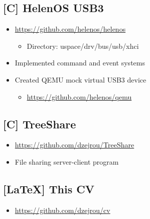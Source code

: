 \documentclass[8pt]{article}
\newcommand\csharp{C\scalerel*{\#}{X}}
\begin{document}
\begin{minipage}[t]{0.45\textwidth}
    \centering

    \subsection*{[C] HelenOS USB3}
    \begin{itemize}
        \item \url{https://github.com/helenos/helenos}
        \begin{itemize}
            \item Directory: uspace/drv/bus/usb/xhci
        \end{itemize}
        \item Implemented command and event systems
        \item Created QEMU mock virtual USB3 device
        \begin{itemize}
            \item \url{https://github.com/helenos/qemu}
        \end{itemize}
    \end{itemize}

    \subsection*{[\csharp] TreeShare}
    \begin{itemize}
        \item \url{https://github.com/dzejrou/TreeShare}
        \item File sharing server-client program
    \end{itemize}

    \subsection*{[\LaTeX] This CV}
    \begin{itemize}
        \item \url{https://github.com/dzejrou/cv}
    \end{itemize}
\end{minipage}
\end{document}
